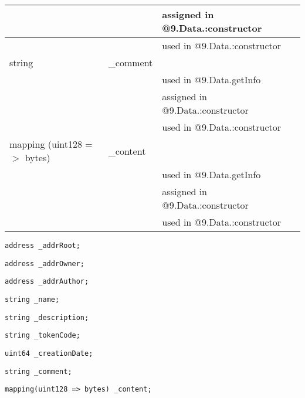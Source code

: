 \begin{tabular}{|l|l|p{5cm}|}
 & & assigned in @9.Data.:constructor\\\hline
 & & used in @9.Data.:constructor\\\hline
string & \_{}comment &  \\\hline
 & & used in @9.Data.getInfo\\\hline
 & & assigned in @9.Data.:constructor\\\hline
 & & used in @9.Data.:constructor\\\hline
mapping (uint128 =$>$ bytes) & \_{}content &  \\\hline
 & & used in @9.Data.getInfo\\\hline
 & & assigned in @9.Data.:constructor\\\hline
 & & used in @9.Data.:constructor\\\hline
\end{tabular}
\fi


\begin{lstlisting}[firstnumber=14]
    address _addrRoot;
\end{lstlisting}

\begin{lstlisting}[firstnumber=15]
    address _addrOwner;
\end{lstlisting}

\begin{lstlisting}[firstnumber=16]
    address _addrAuthor;
\end{lstlisting}

\begin{lstlisting}[firstnumber=19]
    string _name;
\end{lstlisting}

\begin{lstlisting}[firstnumber=20]
    string _description;
\end{lstlisting}

\begin{lstlisting}[firstnumber=21]
    string _tokenCode;
\end{lstlisting}

\begin{lstlisting}[firstnumber=22]
    uint64 _creationDate;
\end{lstlisting}

\begin{lstlisting}[firstnumber=23]
    string _comment;
\end{lstlisting}

\begin{lstlisting}[firstnumber=26]
    mapping(uint128 => bytes) _content;
\end{lstlisting}

